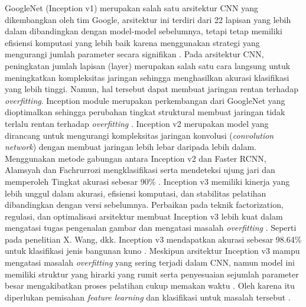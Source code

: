     GoogleNet (Inception v1) merupakan salah satu arsitektur CNN yang dikembangkan oleh tim Google, arsitektur ini terdiri dari 22 lapisan yang lebih dalam dibandingkan dengan model-model sebelumnya, tetapi tetap memiliki efisiensi komputasi yang lebih baik karena menggunakan strategi yang mengurangi jumlah parameter secara signifikan \autocite{Zhong2015}. Pada arsitektur CNN, peningkatan jumlah lapisan (layer) merupakan salah satu cara langsung untuk meningkatkan kompleksitas jaringan sehingga menghasilkan akurasi klasifikasi yang lebih tinggi. Namun, hal tersebut dapat membuat jaringan rentan terhadap \textit{overfitting}. Inception module merupakan perkembangan dari GoogleNet yang dioptimalkan sehingga perubahan tingkat struktural membuat jaringan tidak terlalu rentan terhadap \textit{overfitting} \autocite{Ahmed2020}. Inception v2 merupakan model yang dirancang untuk mengurangi kompleksitas jaringan konvolusi (\textit{convolution network}) dengan membuat jaringan lebih lebar daripada lebih dalam. Menggunakan metode gabungan antara Inception v2 dan Faster RCNN, Alamsyah dan Fachrurrozi mengklasifikasi serta mendeteksi ujung jari dan memperoleh Tingkat akurasi sebesar 90\% \autocite{Alamsyah2019}. Inception v3 memiliki kinerja yang lebih unggul dalam akurasi, efisiensi komputasi, dan stabilitas pelatihan dibandingkan dengan versi sebelumnya. Perbaikan pada teknik factorization, regulasi, dan optimalisasi arsitektur membuat Inception v3 lebih kuat dalam mengatasi tugas pengenalan gambar dan mengatasi masalah \textit{overfitting} \autocite{Lin2019}. Seperti pada penelitian X. Wang, dkk. Inception v3 mendapatkan akurasi sebesar 98.64\% untuk klasifikasi jenis bangunan kuno \autocite{Wang2022}. Meskipun arsitektur Inception v3 mampu mengatasi masalah \textit{overfitting} yang sering terjadi dalam CNN, namun model ini memiliki struktur yang hirarki yang rumit serta penyesuaian sejumlah parameter besar mengakibatkan proses pelatihan cukup memakan waktu \autocite{Mujahid2022}. Oleh karena itu diperlukan pemisahan \textit{feature learning} dan klasifikasi untuk masalah tersebut \autocite{Bae2020}.

